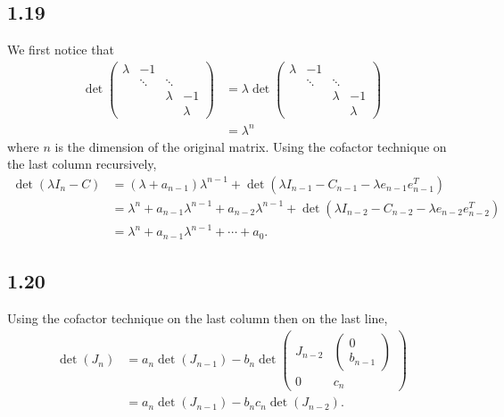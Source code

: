 \subsection*{1.19}
\begin{solution}
  We first notice that
  \begin{align*}
    \det\begin{pmatrix}
      \lambda & -1 &\\
      & \ddots & \ddots\\
      & & \lambda & -1\\
      & & & \lambda
    \end{pmatrix}
    & =
    \lambda
    \det\begin{pmatrix}
      \lambda & -1 &\\
              & \ddots & \ddots\\
              & & \lambda & -1\\
              & & & \lambda
    \end{pmatrix}\\
    & = \lambda^n
  \end{align*}
  where $n$ is the dimension of the original matrix.
  Using the cofactor technique on the last column recursively,
  \begin{align*}
    \det(\lambda I_n - C) & = (\lambda + a_{n-1})\lambda^{n-1}
    + \det(\lambda I_{n-1} - C_{n-1} - \lambda e_{n-1}e_{n-1}^T)\\
    & =
    \lambda^n + a_{n-1}\lambda^{n-1}
    + a_{n-2} \lambda^{n-1}
    + \det(\lambda I_{n-2} - C_{n-2} - \lambda e_{n-2}e_{n-2}^T)\\
    & = \lambda^n + a_{n-1}\lambda^{n-1} + \cdots + a_0.
  \end{align*}
\end{solution}

\subsection*{1.20}
\begin{solution}
  Using the cofactor technique on the last column then on the last line,
  \begin{align*}
    \det(J_n)
    & = a_n\det(J_{n-1}) - b_n
    \det
    \begin{pmatrix}
      J_{n-2} &
      \begin{pmatrix}
        0\\b_{n-1}
      \end{pmatrix}\\
      0 & c_n
    \end{pmatrix}\\
    & = a_n\det(J_{n-1}) - b_n c_n \det(J_{n-2}).
  \end{align*}
\end{solution}

